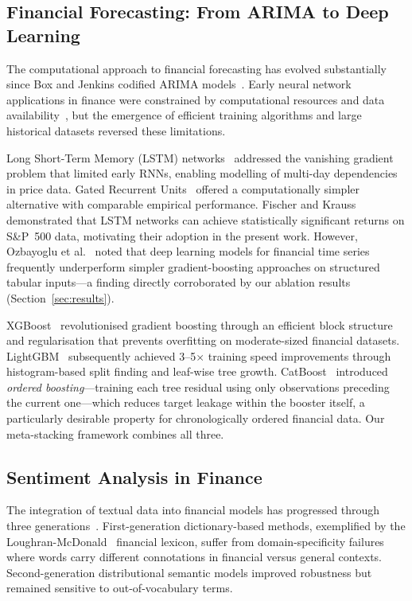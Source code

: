 \documentclass[10pt,a4paper,twoside]{article}
\begin{document}
\subsection{Financial Forecasting: From ARIMA to Deep Learning}

The computational approach to financial forecasting has evolved substantially
since Box and Jenkins codified ARIMA models~\cite{box2015}. Early neural network
applications in finance were constrained by computational resources and
data availability~\cite{white1988}, but the emergence of efficient training
algorithms and large historical datasets reversed these limitations.

Long Short-Term Memory (LSTM) networks~\cite{hochreiter1997} addressed the
vanishing gradient problem that limited early RNNs, enabling modelling of
multi-day dependencies in price data. Gated Recurrent Units~\cite{cho2014}
offered a computationally simpler alternative with comparable empirical
performance. Fischer and Krauss~\cite{fischer2018} demonstrated that LSTM
networks can achieve statistically significant returns on S\&P~500 data,
motivating their adoption in the present work. However, Ozbayoglu et
al.~\cite{ozbayoglu2020} noted that deep learning models for financial time
series frequently underperform simpler gradient-boosting approaches on
structured tabular inputs---a finding directly corroborated by our ablation
results (Section~\ref{sec:results}).

XGBoost~\cite{chen2016} revolutionised gradient boosting through an efficient
block structure and regularisation that prevents overfitting on
moderate-sized financial datasets. LightGBM~\cite{ke2017} subsequently achieved
3--5$\times$ training speed improvements through histogram-based split
finding and leaf-wise tree growth. CatBoost~\cite{prokhorenkova2018} introduced
\emph{ordered boosting}---training each tree residual using only observations
preceding the current one---which reduces target leakage within the booster
itself, a particularly desirable property for chronologically ordered financial
data. Our meta-stacking framework combines all three.

\subsection{Sentiment Analysis in Finance}

The integration of textual data into financial models has progressed through
three generations~\cite{bollen2011}. First-generation dictionary-based methods,
exemplified by the Loughran-McDonald~\cite{loughran2011} financial lexicon,
suffer from domain-specificity failures where words carry different connotations
in financial versus general contexts. Second-generation distributional semantic
models improved robustness but remained sensitive to out-of-vocabulary terms.
\end{document}
